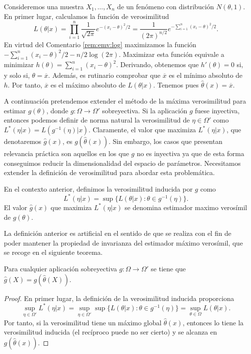 \documentclass{article}
\begin{document}
    \begin{ex}
        Consideremos una muestra $X_1, \ldots, X_n$ de un fenómeno con distribución $N(\theta,1)$. En primer lugar, calculamos la función de verosimilitud
        \[L(\theta | x) = \prod_{i = 1}^n \frac{1}{\sqrt{2\pi}} e^{-(x_i - \theta)^2 / 2} = \frac{1}{(2\pi)^{n/2}}e^{-\sum_{i = 1}^n (x_i - \theta)^2 / 2}.\]
        En virtud del Comentario \ref{rem:emv:log} maximizamos la función $-\sum_{i = 1}^n (x_i - \theta)^2 / 2 - n/2 \log(2\pi)$. Maximizar esta función equivale a minimizar $h(\theta) = \sum_{i = 1}^n (x_i - \theta)^2$. Derivando, obtenemos que $h'(\theta) = 0$ si, y solo si, $\theta = \overline{x}$. Además, es rutinario comprobar que $\overline{x}$ es el mínimo absoluto de $h$. Por tanto, $\overline{x}$ es el máximo absoluto de $L(\theta | x)$. Tenemos pues $\hat{\theta}(x) = \overline{x}$.
    \end{ex}

    A continuación pretendemos extender el método de la máxima verosimilitud para estimar $g(\theta)$, donde $g : \Omega \to \Omega'$ sobreyectiva. Si la aplicación $g$ fuese inyectiva, entonces podemos definir de norma natural la verosimilitud de $\eta \in \Omega'$ como $L^*(\eta | x) = L(g^{-1}(\eta) | x)$. Claramente, el valor que maximiza $L^*(\eta | x)$, que denotaremos $\hat{g}(x)$, es $g(\hat{\theta}(x))$. Sin embargo, los casos que presentan relevancia práctica son aquellos en los que $g$ no es inyectiva ya que de esta forma conseguimos reducir la dimensionalidad del espacio de parámetros. Necesitamos extender la definición de verosimilitud para abordar esta problemática.

    \begin{definition}
        En el contexto anterior, definimos la verosimilitud inducida por $g$ como
        \[L^*(\eta|x) = \sup\{L(\theta | x): \theta \in g^{-1}(\eta)\}.\]
        El valor $\hat{g}(x)$ que maximiza $L^*(\eta|x)$ se denomina estimador maximo verosímil de $g(\theta)$.
    \end{definition}

    La definición anterior es artificial en el sentido de que se realiza con el fin de poder mantener la propiedad de invarianza del estimador máximo verosímil, que se recoge en el siguiente teorema.

    \begin{thm}
        Para cualquier aplicación sobreyectiva $g: \Omega \to \Omega'$ se tiene que $\hat{g}(X) = g(\hat{\theta}(X))$.
    \end{thm}
    \begin{proof}
        En primer lugar, la definición de la verosimilitud inducida proporciona
        \[\sup_{\eta \in \Omega'} L^*(\eta|x) = \sup_{\eta \in \Omega'} \sup\{L(\theta | x): \theta \in g^{-1}(\eta)\} = \sup_{\theta \in \Omega} L(\theta | x).\]
        Por tanto, si la verosimilitud tiene un máximo global $\hat\theta(x)$, entonces lo tiene la verosimilitud inducida (el recíproco puede no ser cierto) y se alcanza en $g(\hat\theta(x))$.
    \end{proof}
\end{document}
